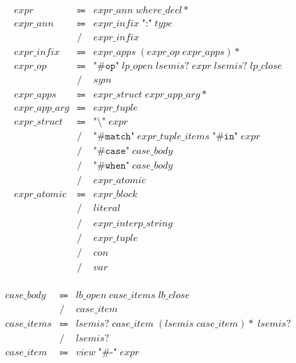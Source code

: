 \begin{align*}
    \begin{array}{rcll}
        \mathit{expr}
        &\Coloneq &\mathit{expr\_ann}\; \mathit{where\_decl}{*} \\
        \mathit{expr\_ann}
        &\Coloneq &\mathit{expr\_infix}\; \texttt{":"}\; \mathit{type} \\
        &\mathrel{/} &\mathit{expr\_infix} \\
        \mathit{expr\_infix}
        &\Coloneq &\mathit{expr\_apps}\; (\mathit{expr\_op}\; \mathit{expr\_apps}){*} \\
        \mathit{expr\_op}
        &\Coloneq &\texttt{"\#op"}\; \mathit{lp\_open}\; \mathit{lsemis}{?}\; \mathit{expr}\; \mathit{lsemis}{?}\; \mathit{lp\_close} \\
        &\mathrel{/} &\mathit{sym} \\
        \mathit{expr\_apps}
        &\Coloneq &\mathit{expr\_struct}\; \mathit{expr\_app\_arg}{*} \\
        \mathit{expr\_app\_arg}
        &\Coloneq &\mathit{expr\_tuple} \\
        \mathit{expr\_struct}
        &\Coloneq &\texttt{"\textbackslash"}\; \mathit{expr} \\
        &\mathrel{/} &\texttt{"\#match"}\; \mathit{expr\_tuple\_items}\; \texttt{"\#in"}\; \mathit{expr} \\
        &\mathrel{/} &\texttt{"\#case"}\; \mathit{case\_body} \\
        &\mathrel{/} &\texttt{"\#when"}\; \mathit{case\_body} \\
        &\mathrel{/} &\mathit{expr\_atomic} \\
        \mathit{expr\_atomic}
        &\Coloneq &\mathit{expr\_block} \\
        &\mathrel{/} &\mathit{literal} \\
        &\mathrel{/} &\mathit{expr\_interp\_string} \\
        &\mathrel{/} &\mathit{expr\_tuple} \\
        &\mathrel{/} &\mathit{con} \\
        &\mathrel{/} &\mathit{var}
    \end{array}
\end{align*}

\begin{align*}
    \begin{array}{rcll}
        \mathit{case\_body}
        &\Coloneq &\mathit{lb\_open}\; \mathit{case\_items}\; \mathit{lb\_close} \\
        &\mathrel{/} &\mathit{case\_item} \\
        \mathit{case\_items}
        &\Coloneq &\mathit{lsemis}{?}\; \mathit{case\_item}\; (\mathit{lsemis}\; \mathit{case\_item}){*}\; \mathit{lsemis}{?} \\
        &\mathrel{/} &\mathit{lsemis}{?} \\
        \mathit{case\_item}
        &\Coloneq &\mathit{view}\; \texttt{"\#-"}\; \mathit{expr}
    \end{array}
\end{align*}

